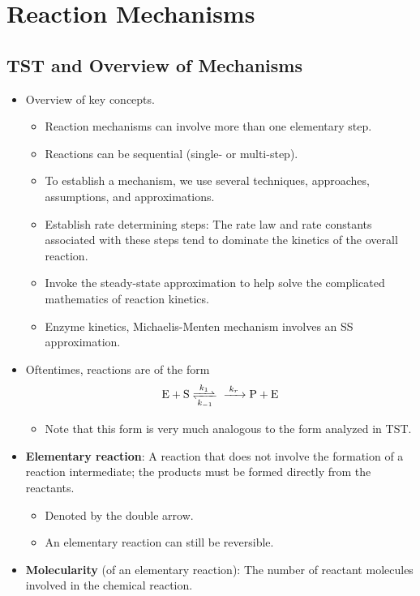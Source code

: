\documentclass[../notes.tex]{subfiles}
\begin{document}
\chapter{Reaction Mechanisms}
\section{TST and Overview of Mechanisms}
\begin{itemize}
    \item {}Overview of key concepts.
    \begin{itemize}
        \item Reaction mechanisms can involve more than one elementary step.
        \item Reactions can be sequential (single- or multi-step).
        \item To establish a mechanism, we use several techniques, approaches, assumptions, and approximations.
        \item Establish rate determining steps: The rate law and rate constants associated with these steps tend to dominate the kinetics of the overall reaction.
        \item Invoke the steady-state approximation to help solve the complicated mathematics of reaction kinetics.
        \item Enzyme kinetics, Michaelis-Menten mechanism involves an SS approximation.
    \end{itemize}
    \item Oftentimes, reactions are of the form
    \begin{align*}
        \ce{E + S <=>[$k_1$][$k_{-1}$] ->[$k_r$] P + E}
    \end{align*}
    \begin{itemize}
        \item Note that this form is very much analogous to the form analyzed in TST.
    \end{itemize}
    \item \textbf{Elementary reaction}: A reaction that does not involve the formation of a reaction intermediate; the products must be formed directly from the reactants.
    \begin{itemize}
        \item Denoted by the double arrow.
        \item An elementary reaction can still be reversible.
    \end{itemize}
    \item \textbf{Molecularity} (of an elementary reaction): The number of reactant molecules involved in the chemical reaction.

\end{itemize}
\end{document}
